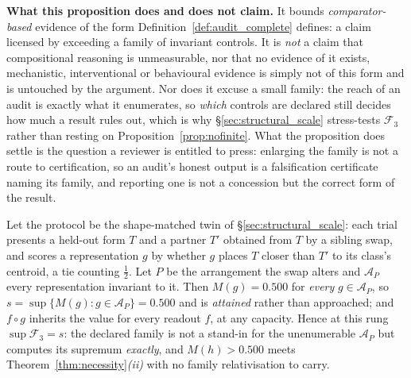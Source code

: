 \noindent \textbf{What this proposition does and does not claim.} It bounds \emph{comparator-based} evidence of the form Definition~\ref{def:audit_complete} defines: a claim licensed by exceeding a family of invariant controls. It is \emph{not} a claim that compositional reasoning is unmeasurable, nor that no evidence of it exists, mechanistic, interventional or behavioural evidence is simply not of this form and is untouched by the argument. Nor does it excuse a small family: the reach of an audit is exactly what it enumerates, so \emph{which} controls are declared still decides how much a result rules out, which is why \S\ref{sec:structural_scale} stress-tests $\mathcal{F}_3$ rather than resting on Proposition~\ref{prop:nofinite}. What the proposition does settle is the question a reviewer is entitled to press: enlarging the family is not a route to certification, so an audit's honest output is a falsification certificate naming its family, and reporting one is not a concession but the correct form of the result.

\begin{proposition}
\label{prop:twin_exact}
Let the protocol be the shape-matched twin of \S\ref{sec:structural_scale}: each trial presents a held-out form $T$ and a partner $T'$ obtained from $T$ by a sibling swap, and scores a representation $g$ by whether $g$ places $T$ closer than $T'$ to its class's centroid, a tie counting $\tfrac{1}{2}$. Let $P$ be the arrangement the swap alters and $\mathcal{A}_P$ every representation invariant to it. Then $M(g)=0.500$ for \emph{every} $g\in\mathcal{A}_P$, so $s=\sup\{M(g):g\in\mathcal{A}_P\}=0.500$ and is \emph{attained} rather than approached; and $f\circ g$ inherits the value for every readout $f$, at any capacity. Hence at this rung $\sup\mathcal{F}_3=s$: the declared family is not a stand-in for the unenumerable $\mathcal{A}_P$ but computes its supremum \emph{exactly}, and $M(h)>0.500$ meets Theorem~\ref{thm:necessity}\emph{(ii)} with no family relativisation to carry.
\end{proposition}

